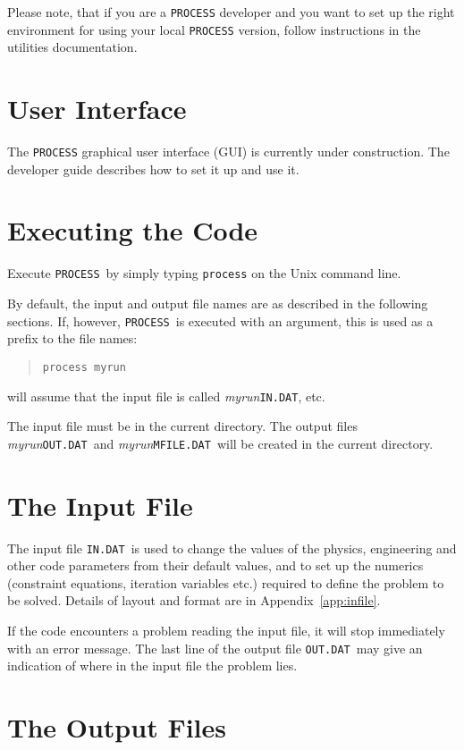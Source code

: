 \documentclass[11pt,a4paper]{report}
\newcommand{\indat}{\mbox{\texttt{IN.DAT}}}
\newcommand{\mfile}{\mbox{\texttt{MFILE.DAT}}}
\newcommand{\outdat}{\mbox{\texttt{OUT.DAT}}}
\newcommand{\process}{\mbox{\texttt{PROCESS}}}
\begin{document}
Please note, that if you are a \process\/ developer and you want to set up the right environment for using your local \process\/ version, follow instructions in the utilities documentation.

\section{User Interface}
\label{sec:gui}
The \process\/ graphical user interface (GUI) is currently under construction. The developer guide describes how to set it up and use it. 


\section{Executing the Code}

Execute \process\ by simply typing \texttt{process} on the Unix command line.

By default, the input and output file names are as described in the following
sections. If, however, \process\ is executed with an argument, this is used as
a prefix to the file names:
\begin{quote}
\begin{verbatim}
process myrun
\end{verbatim}
\end{quote}
will assume that the input file is called \textit{myrun}\indat, etc.

The input file must be in the current directory.  The output files \textit{myrun}\outdat\
and \textit{myrun}\mfile\ will be created in the current directory.

\section{The Input File}
\label{sec:infile}

The input file \indat\ is used to change the values of the physics,
engineering and other code parameters from their default values, and to set up
the numerics (constraint equations, iteration variables etc.) required to
define the problem to be solved. Details of layout and format are in
Appendix~\ref{app:infile}.

If the code encounters a problem reading the input file, it will stop
immediately with an error message. The last line of the output file \outdat\
may give an indication of where in the input file the problem lies.

\section{The Output Files}
\end{document}
